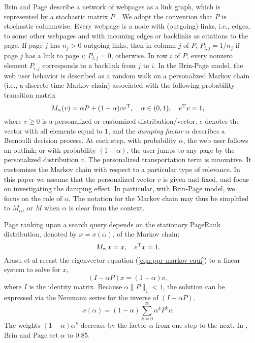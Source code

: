 \documentclass[conference]{IEEEtran}
\begin{document}
Brin and Page describe a network of webpages as a link graph, which is
represented by a stochastic matrix $P$~\cite{page1999pagerank}. We adopt
the convention that $P$ is stochastic columnwise. Every webpage is a
node with (outgoing) links, i.e., edges, to some other webpages and with
incoming edges or backlinks as citations to the page. If page $j$ has
$n_j >0 $ outgoing links, then in column $j$ of $P$, $P_{i,j} = 1/n_j$
if page $j$ has a link to page $i$; $P_{i,j}=0$, otherwise. In row $i$
of $P$, every nonzero element $P_{i,j}$ corresponds to a backlink from
$j$ to $i$.
%
In the Brin-Page model, the web user behavior is described as a random
walk on a personalized Markov chain (i.e., a discrete-time Markov chain)
associated with the following probability transition matrix
% 
\begin{equation}
\label{eqn:bp-Bernoulli}
M_{\alpha}(v) = \alpha P + (1 - \alpha)v e^{\rm T}, 
\quad \alpha \in (0,1), 
\quad e^{\rm T}v = 1, 
\end{equation}%
%
where $v\geq 0$ is a personalized or customized distribution/vector, $e$
denotes the vector with all elements equal to $1$, and the \emph{damping
  factor} $\alpha$ describes a Bernoulli decision process.  At each
step, with probability $\alpha$, the web user follows an outlink; or
with probability $(1-\alpha)$, the user jumps to any page by the personalized
distribution $v$.  The personalized transportation term is
innovative. It customizes the Markov chain with respect to a particular
type of relevance.
%
In this paper we assume that the personalized vector $v$ is given and
fixed, and focus on investigating the damping effect. In particular, 
with Brin-Page model, we focus on the role of $\alpha$.
The notation for the Markov chain may thus be simplified to
$M_{\alpha}$, or $M$ when $\alpha$ is clear from the context.

Page ranking upon a search query depends on the stationary PageRank
distribution, denoted by $x=x(\alpha)$, of the Markov chain:
% 
\begin{equation}
\label{eqn:ppr-markov-equi}
  M_{\alpha}  \,  x = x, 
  \quad e^{\rm T}x = 1. 
\end{equation}%
%
Arasu et al\cite{arasu2002pagerank} recast the eigenvector equation
(\ref{eqn:ppr-markov-equi}) to a linear system to solve for $x$,
% 
\begin{equation}
\label{eqn:ppr-linear}
(I - \alpha P)x = (1 - \alpha)v, 
\end{equation}
%
where $I$ is the identity matrix.
Because $\alpha \|P\|_{1} < 1$, the solution can be expressed via the 
Neumann series for the inverse of $(I-\alpha P)$, 
% 
\begin{equation}
\label{eqn:bp-solution}
x(\alpha)  = (1-\alpha) \sum_{k = 0} ^ {\infty} \alpha^k P^k v.
\end{equation}
%
The weights $(1-\alpha)\alpha^k$ decrease by the factor $\alpha$ from one step to the
next. In \cite{page1999pagerank}, Brin and Page set $\alpha$ to $0.85$.
\end{document}
